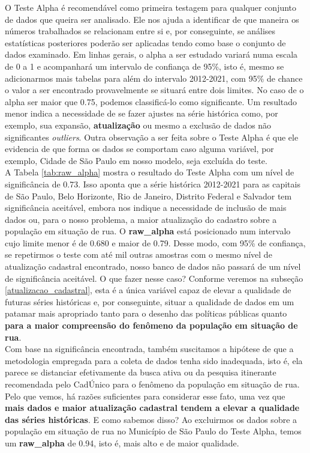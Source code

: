 \documentclass[14pt]{extarticle}
\begin{document}
O Teste Alpha é recomendável como primeira testagem para qualquer conjunto de dados que queira ser analisado. Ele nos ajuda a identificar de que maneira os números trabalhados se relacionam entre si e, por conseguinte, se análises estatísticas posteriores poderão ser aplicadas tendo como base o conjunto de dados examinado. Em linhas gerais, o alpha a ser estudado variará numa escala de 0 a 1 e acompanhará um intervalo de confiança de 95\%, isto é, mesmo se adicionarmos mais tabelas para além do intervalo 2012-2021, com 95\% de chance o valor a ser encontrado provavelmente se situará entre dois limites. No caso de o alpha ser maior que 0.75, podemos classificá-lo como significante. Um resultado menor indica a necessidade de se fazer ajustes na série histórica como, por exemplo, sua expansão, \textbf{atualização} ou mesmo a exclusão de dados não significantes \emph{outliers}. Outra observação a ser feita sobre o Teste Alpha é que ele evidencia de que forma os dados se comportam caso alguma variável, por exemplo, Cidade de São Paulo em nosso modelo, seja excluída do teste.\\ 

A Tabela \ref{tab:raw_alpha} mostra o resultado do Teste Alpha com um nível de significância de 0.73. Isso aponta que a série histórica 2012-2021 para as capitais de São Paulo, Belo Horizonte, Rio de Janeiro, Distrito Federal e Salvador tem significância aceitável, embora nos indique a necessidade de inclusão de mais dados ou, para o nosso problema, a maior atualização do cadastro sobre a população em situação de rua. O \textbf{raw\_alpha} está posicionado num intervalo cujo limite menor é de 0.680 e maior de 0.79. Desse modo, com 95\% de confiança, se repetirmos o teste com até mil outras amostras com o mesmo nível de atualização cadastral encontrado, nosso banco de dados não passará de um nível de significância aceitável. O que fazer nesse caso? Conforme veremos na subseção \ref{atualizacao_cadastral}, esta é a única variável capaz de elevar a qualidade de futuras séries históricas e, por conseguinte, situar a qualidade de dados em um patamar mais apropriado tanto para o desenho das políticas públicas quanto \textbf{para a maior compreensão do fenômeno da população em situação de rua}.\\

Com base na significância encontrada, também suscitamos a hipótese de que a metodologia empregada para a coleta de dados tenha sido inadequada, isto é, ela parece se distanciar efetivamente da busca ativa ou da pesquisa itinerante recomendada pelo CadÚnico para o fenômeno da população em situação de rua. Pelo que vemos, há razões suficientes para considerar esse fato, uma vez que \textbf{mais dados e maior atualização cadastral tendem a elevar a qualidade das séries históricas}. E como sabemos disso? Ao excluirmos os dados sobre a população em situação de rua no Município de São Paulo do Teste Alpha, temos um \textbf{raw\_alpha} de 0.94, isto é, mais alto e de maior qualidade.
\end{document}
